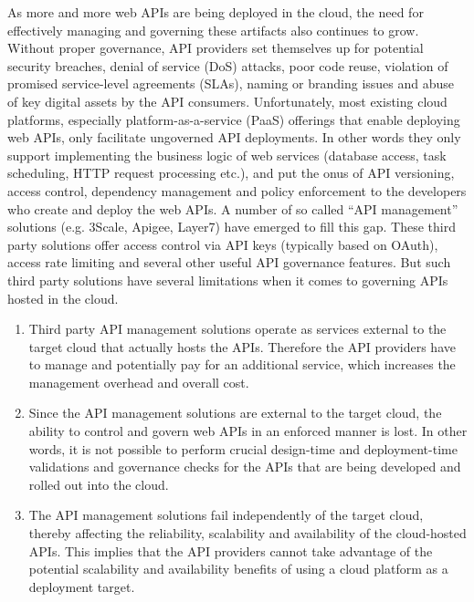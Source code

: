 As more and more web APIs are being deployed in the cloud, the need for effectively managing and governing these artifacts also
continues to grow. Without proper governance, API providers set themselves up for potential security breaches, denial of service (DoS)
attacks, poor code reuse, violation of promised service-level agreements (SLAs), naming or branding issues and abuse of key digital 
assets by the API consumers. Unfortunately, most existing cloud platforms, especially platform-as-a-service (PaaS) offerings that enable
deploying web APIs, only facilitate ungoverned API deployments. In other words they only support implementing the business logic of
web services (database access, task scheduling, HTTP request processing etc.), and put the onus of API versioning,  access control, 
dependency management and policy enforcement to the developers who create and deploy the web APIs. A number of so called
``API management'' solutions (e.g. 3Scale, Apigee, Layer7) have emerged to fill this gap. These third party solutions offer access control
via API keys (typically based on OAuth), access rate limiting and several other useful API governance features. But such third party 
solutions have several limitations when it comes to governing APIs hosted in the cloud.

\begin{enumerate}
\item Third party API management solutions operate as services external to the target cloud that actually hosts the APIs. Therefore 
the API providers have to manage and potentially pay for an additional service, which increases the management overhead and overall cost.
\item Since the API management solutions are external to the target cloud, the ability to control and govern web APIs in an enforced manner is
lost. In other words, it is not possible to perform crucial design-time and deployment-time validations and governance checks for the APIs
that are being developed and rolled out into the cloud. 
\item The API management solutions fail independently of the target cloud, thereby affecting the reliability, scalability and availability of the 
cloud-hosted APIs. This implies that the API providers cannot take advantage of the potential scalability and availability benefits of using a cloud
platform as a deployment target.
\end{enumerate}

